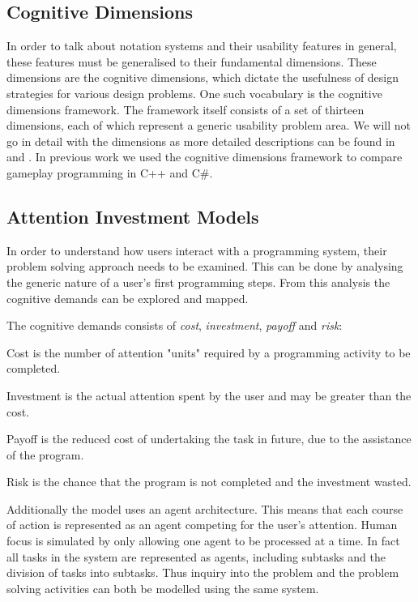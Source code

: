\subsection{Cognitive Dimensions} \label{sec:cog-dim}
In order to talk about notation systems and their usability features in general, these features must be generalised to their fundamental dimensions. These dimensions are the cognitive dimensions, which dictate the usefulness of design strategies for various design problems. One such vocabulary is the cognitive dimensions framework\cite{green1996usability}. The framework itself consists of a set of thirteen dimensions, each of which represent a generic usability problem area. We will not go in detail with the dimensions as more detailed descriptions can be found in \cite{green1996usability} and \cite{p92018gameplay}. In previous work we used the cognitive dimensions framework to compare gameplay programming in C++ and C\#\cite{p92018gameplay}.

\subsection{Attention Investment Models} \label{sec:attention-investment}
In order to understand how users interact with a programming system, their problem solving approach needs to be examined. This can be done by analysing the generic nature of a user's first programming steps. From this analysis the cognitive demands can be explored and mapped\cite{blackwell2002first}.

The cognitive demands consists of \textit{cost}, \textit{investment}, \textit{payoff} and \textit{risk}:
\begin{labeling}{\quad\quad}
    \item[Cost] is the number of attention "units" required by a programming activity to be completed.
    \item[Investment] is the actual attention spent by the user and may be greater than the cost.
    \item[Payoff] is the reduced cost of undertaking the task in future, due to the assistance of the program.
    \item[Risk] is the chance that the program is not completed and the investment wasted.
\end{labeling}

Additionally the model uses an agent architecture. This means that each course of action is represented as an agent competing for the user's attention. Human focus is simulated by only allowing one agent to be processed at a time. In fact all tasks in the system are represented as agents, including subtasks and the division of tasks into subtasks. Thus inquiry into the problem and the problem solving activities can both be modelled using the same system.

